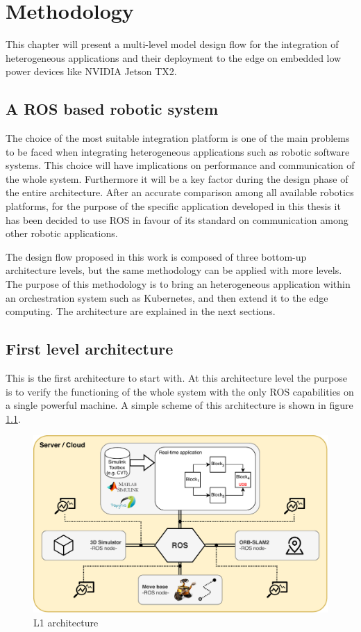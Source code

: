 \chapter{Methodology} \label{chap:methodology}

This chapter will present a multi-level model design flow for the integration of heterogeneous applications and their deployment to the edge on embedded low power devices like NVIDIA Jetson TX2.


\section{A ROS based robotic system}
The choice of the most suitable integration platform is one of the main problems to be faced when integrating heterogeneous applications such as robotic software systems. This choice will have implications on performance and communication of the whole system. Furthermore it will be a key factor during the design phase of the entire architecture.
After an accurate comparison among all available robotics platforms, for the purpose of the specific application developed in this thesis it has been decided to use ROS \cite{ROS} in favour of its standard on communication among other robotic applications.


The design flow proposed in this work is composed of three bottom-up architecture levels, but the same methodology can be applied with more levels.
The purpose of this methodology is to bring an heterogeneous application within an orchestration system such as Kubernetes, and then extend it to the edge computing. %
The architecture are explained in the next sections.




\section{First level architecture}
This is the first architecture to start with.
At this architecture level the purpose is to verify the functioning of the whole system with the only ROS capabilities on a single powerful machine. A simple scheme of this architecture is shown in figure \ref{fig:l1arch}.

\begin{figure}[htbp]
	\centering
	\includegraphics[width=\textwidth]{images/L1-arch}
	\caption{L1 architecture}
	\label{fig:l1arch}
\end{figure}

